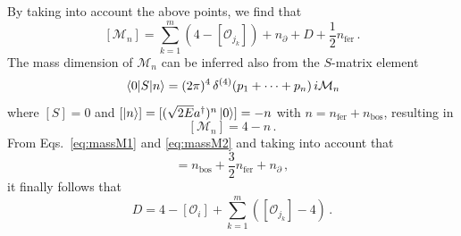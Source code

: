 \documentclass[prl,twocolumn,twoside,preprintnumbers,superscriptaddress, nofootinbib]{revtex4-2}
\newcommand{\Ocal}[0]{\mathcal{O}}
\begin{document}
%
By taking into account the above points, we find that
\begin{equation}\label{eq:massM1}
    [\mathcal M_n] = \sum_{k=1}^m(4-[\Ocal_{j_k}]) + n_\partial + D +\frac{1}{2}n_{\text{fer}}\,.
\end{equation}    
%
The mass dimension of $\mathcal M_n$ can be inferred also from the $S$-matrix element
%
    \begin{equation}
    \mel{0}{S}{n} = (2\pi)^4 \, \delta^{(4)}(p_1+\dotsb+p_n) \, i \mathcal M_n
\end{equation}
%
where $[S]=0$ and $[\ket{n}] = [(\sqrt{2E} a^\dagger)^n \ket{0}] = -n$ with $n = n_{\text{fer}} + n_{\text{bos}}$, resulting in
%
\begin{equation}\label{eq:massM2}
    [\mathcal M_{n}] = 4 - n\,.
\end{equation}
%
From Eqs.~\eqref{eq:massM1} and \eqref{eq:massM2} 
and taking into account that
%
    \begin{equation}
    [\mathcal O_i] = n_{\text{bos}} + \frac{3}{2}n_{\text{fer}} + n_\partial\,,
\end{equation}
%
it finally follows that
    \begin{equation}
    D= 4 - [\mathcal O_i] + \sum_{k=1}^m([\Ocal_{j_k}]-4)\,. 
\end{equation}

%
\end{document}
